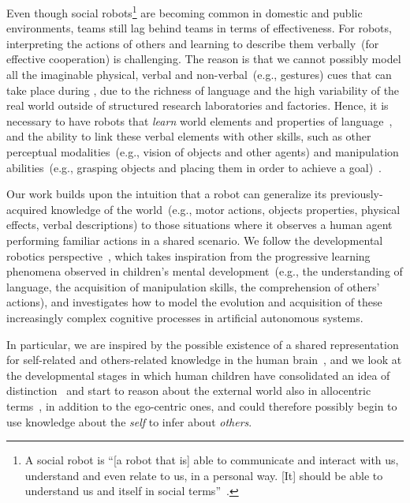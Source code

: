 Even though social robots\footnote{A social robot is ``[a robot that is] able to communicate and interact with us, understand and even relate to us, in a personal way. [It] should be able to understand us and itself in social terms''~\cite{breazeal:2002:dsr}.} are becoming common in domestic and public environments, \hr{} teams still lag behind \hh{} teams in terms of effectiveness.
For robots, interpreting the actions of others and learning to describe them verbally~(for effective cooperation) is challenging.
The reason is that we cannot possibly model all the imaginable physical, verbal and non-verbal~(e.g., gestures) cues that can take place during \hri, due to the richness of language and the high variability of the real world outside of structured research laboratories and factories.
Hence, it is necessary to have robots that \emph{learn} world elements and properties of language~\cite{iwahashi:2007:hri}, and the ability to link these verbal elements with other skills, such as other perceptual modalities~(e.g., vision of objects and other agents) and manipulation abilities~(e.g., grasping objects and placing them in order to achieve a goal)~\cite{steels:2003:trendscogsci}.

Our work builds upon the intuition that a robot can generalize its previously-acquired knowledge of the world~(e.g., motor actions, objects properties, physical effects, verbal descriptions) to those situations where it observes a human agent performing familiar actions in a shared \hr{} scenario.
We follow the developmental robotics perspective~\cite{lungarella:2003:devrobsurvey,cangelosi:2015:devrobbook},
which takes inspiration from the progressive learning phenomena observed in children's mental development~(e.g., the understanding of language, the acquisition of manipulation skills, the comprehension of others' actions), and investigates how to model the evolution and acquisition of these increasingly complex cognitive processes in artificial autonomous systems.

In particular, we are inspired by the possible existence of a shared representation for self-related and others-related knowledge in the human brain~\cite{gallagher:1996:earliest,rizzolatti:2001:nrn,decety:2003:sharedrep}, and we look at the developmental stages in which human children have consolidated an idea of \selfother{} distinction~\cite{symons:2004:mental} and start to reason about the external world also in allocentric terms~\cite{ribordy:2013:development}, in addition to the ego-centric ones, and could therefore possibly begin to use knowledge about the \emph{self} to infer about \emph{others}.


